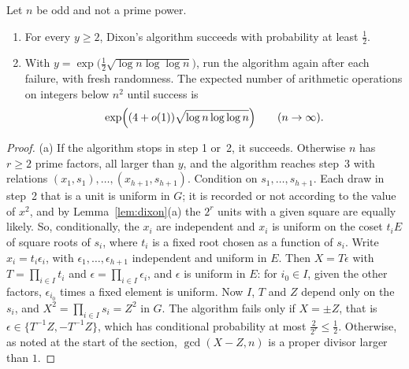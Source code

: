 \begin{theorem}[Dixon, 1981]\label{thm:dixon}
Let $n$ be odd and not a prime power.
\begin{enumerate}[label=(\alph*)]
\item For every $y\ge2$, Dixon's algorithm succeeds with probability at least $\frac12$.
\item With $y=\exp\bigl(\frac12\sqrt{\log n\log\log n}\bigr)$, run the algorithm again after each failure, with fresh randomness. The expected number of arithmetic operations on integers below $n^2$ until success is
\[
\exp\Bigl((4+o(1))\sqrt{\log n\log\log n}\Bigr)\qquad(n\to\infty).
\]
\end{enumerate}
\end{theorem}
\begin{proof}
(a) If the algorithm stops in step 1 or~2, it succeeds. Otherwise $n$ has $r\ge2$ prime factors, all larger than $y$, and the algorithm reaches step~3 with relations $(x_1,s_1),\dots,(x_{h+1},s_{h+1})$. Condition on $s_1,\dots,s_{h+1}$. Each draw in step~2 that is a unit is uniform in $G$; it is recorded or not according to the value of $x^2$, and by Lemma~\ref{lem:dixon}(a) the $2^r$ units with a given square are equally likely. So, conditionally, the $x_i$ are independent and $x_i$ is uniform on the coset $t_iE$ of square roots of $s_i$, where $t_i$ is a fixed root chosen as a function of $s_i$. Write $x_i=t_i\epsilon_i$, with $\epsilon_1,\dots,\epsilon_{h+1}$ independent and uniform in $E$. Then $X=T\epsilon$ with $T=\prod_{i\in I}t_i$ and $\epsilon=\prod_{i\in I}\epsilon_i$, and $\epsilon$ is uniform in $E$: for $i_0\in I$, given the other factors, $\epsilon_{i_0}$ times a fixed element is uniform. Now $I$, $T$ and $Z$ depend only on the $s_i$, and $X^2=\prod_{i\in I}s_i=Z^2$ in $G$. The algorithm fails only if $X=\pm Z$, that is $\epsilon\in\{T^{-1}Z,-T^{-1}Z\}$, which has conditional probability at most $\frac2{2^r}\le\frac12$. Otherwise, as noted at the start of the section, $\gcd(X-Z,n)$ is a proper divisor larger than $1$.


\end{proof}
